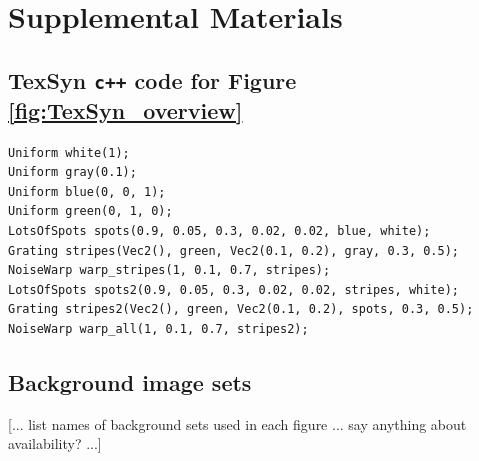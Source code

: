 \documentclass[sigconf]{acmart}
\begin{document}





\newpage
\onecolumn
\appendix
\section{Supplemental Materials}


\subsection{TexSyn \texttt{c++} code for Figure \ref{fig:TexSyn_overview}}
\begin{small}
\begin{verbatim}
Uniform white(1);
Uniform gray(0.1);
Uniform blue(0, 0, 1);
Uniform green(0, 1, 0);
LotsOfSpots spots(0.9, 0.05, 0.3, 0.02, 0.02, blue, white);
Grating stripes(Vec2(), green, Vec2(0.1, 0.2), gray, 0.3, 0.5);
NoiseWarp warp_stripes(1, 0.1, 0.7, stripes);
LotsOfSpots spots2(0.9, 0.05, 0.3, 0.02, 0.02, stripes, white);
Grating stripes2(Vec2(), green, Vec2(0.1, 0.2), spots, 0.3, 0.5);
NoiseWarp warp_all(1, 0.1, 0.7, stripes2);
\end{verbatim}
\end{small}


\subsection{Background image sets}
[... list names of background sets used in each figure ... say anything about availability? ...]
\end{document}
